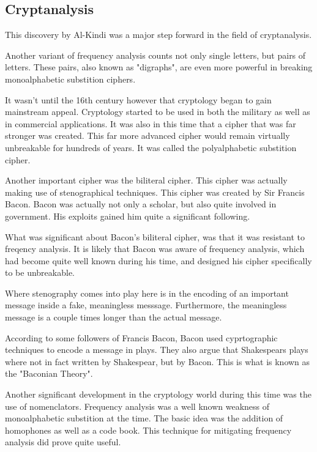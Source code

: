 \documentclass{article}
\begin{document}
    \subsection{Cryptanalysis}

    This discovery by Al-Kindi was a major step forward in the field of cryptanalysis.

    Another variant of frequency analysis counts not only single letters, but
    pairs of letters. These pairs, also known as "digraphs", are even more powerful
    in breaking monoalphabetic substition ciphers.

    It wasn't until the 16th century however that cryptology began to gain
    mainstream appeal.
    Cryptology started to be used in both the military as well as in commercial applications.
    It was also in this time that a cipher that was far stronger was created.
    This far more advanced cipher would remain virtually unbreakable for hundreds of years.
    It was called the polyalphabetic substition cipher.

    Another important cipher was the biliteral cipher. This cipher was actually
    making use of stenographical techniques. This cipher was created
    by Sir Francis Bacon. Bacon was actually not only a scholar, but also quite
    involved in government. His exploits gained him quite a significant following.

    What was significant about Bacon's biliteral cipher, was that it was resistant to
    freqency analysis. It is likely that Bacon was aware of frequency analysis,
    which had become quite well known during his time, and designed his cipher
    specifically to be unbreakable.

    Where stenography comes into play here is in the encoding of an important message
    inside a fake, meaningless messsage. Furthermore, the meaningless message is
    a couple times longer than the actual message.

    According to some followers of Francis Bacon, Bacon used cyprtographic techniques
    to encode a message in plays. They also argue that Shakespears plays where
    not in fact written by Shakespear, but by Bacon. This is what is known
    as the "Baconian Theory".

    Another significant development in the cryptology world during this time
    was the use of nomenclators. Frequency analysis was a well known weakness
    of monoalphabetic substition at the time.
    The basic idea was the addition of homophones as well as a code book.
    This technique for mitigating frequency analysis did prove quite useful.
\end{document}
